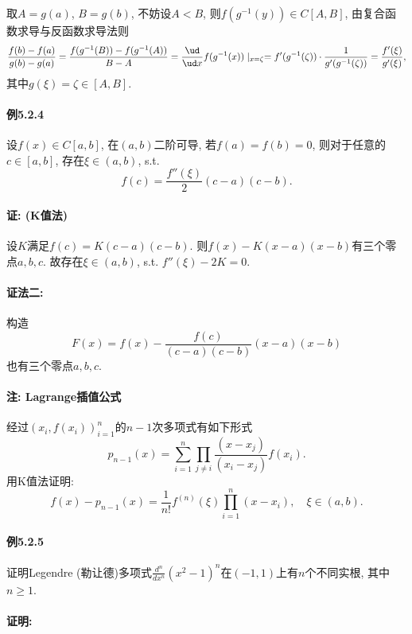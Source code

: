 取$A=g(a)$, $B=g(b)$, 不妨设$A<B$, 则$f(g^{-1}(y))\in C[A,B]$, 由复合函数求导与反函数求导法则
\[
\frac{f(b)-f(a)}{g(b)-g(a)}=\frac{f(g^{-1}(B))-f(g^{-1}(A))}{B-A}=\frac{\ud}{\ud x}f(g^{-1}(x))\mid_{x=\zeta}=f'(g^{-1}(\zeta))\cdot\frac{1}{g'(g^{-1}(\zeta))}=\frac{f'(\xi)}{g'(\xi)},
\]
其中$g(\xi)=\zeta\in[A,B]$. 

\paragraph{例5.2.4}

设$f(x)\in C[a,b]$, 在$(a,b)$二阶可导, 若$f(a)=f(b)=0$, 则对于任意的$c\in[a,b]$,
存在$\xi\in(a,b)$, s.t.
\[
f(c)=\frac{f''(\xi)}{2}(c-a)(c-b).
\]


\paragraph{证: (K值法)}

设$K$满足$f(c)=K(c-a)(c-b)$. 则$f(x)-K(x-a)(x-b)$有三个零点$a,b,c$. 故存在$\xi\in(a,b)$,
s.t. $f''(\xi)-2K=0$.

\paragraph{证法二:}

构造
\[
F(x)=f(x)-\frac{f(c)}{(c-a)(c-b)}(x-a)(x-b)
\]
也有三个零点$a,b,c$.

\paragraph{注: Lagrange插值公式}

经过$\left(x_{i},f(x_{i})\right)_{i=1}^{n}$的$n-1$次多项式有如下形式
\[
p_{n-1}(x)=\sum_{i=1}^{n}\prod_{j\ne i}\frac{(x-x_{j})}{(x_{i}-x_{j})}f(x_{i}).
\]
用K值法证明:
\[
f(x)-p_{n-1}(x)=\frac{1}{n!}f^{(n)}(\xi)\prod_{i=1}^{n}(x-x_{i}),\quad\xi\in(a,b).
\]


\paragraph{例5.2.5}

证明Legendre (勒让德)多项式$\frac{d^{n}}{dx^{n}}\left(x^{2}-1\right)^{n}$在$(-1,1)$上有$n$个不同实根,
其中$n\ge1$.

\paragraph{证明:}

